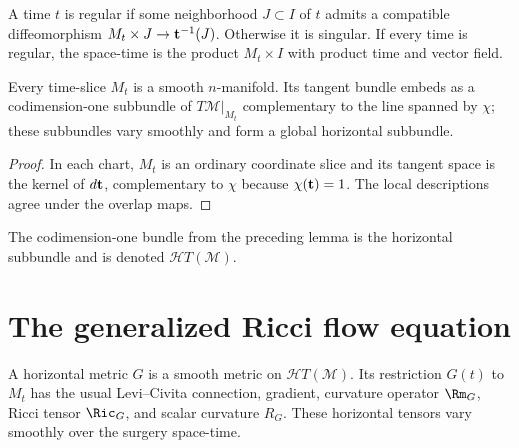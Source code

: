 \begin{definition}
\label{def:regular-singular-time-surgery}
A time $t$ is regular if some neighborhood $J\subset I$ of $t$ admits a
compatible diffeomorphism $M_t\times J\to{\bf t}^{-1}(J)$. Otherwise it is
singular. If every time is regular, the space-time is the product
$M_t\times I$ with product time and vector field.
\end{definition}

\begin{lemma}
\label{lem:time-slice-smooth-manifold}
Every time-slice $M_t$ is a smooth $n$-manifold. Its tangent bundle embeds as a
codimension-one subbundle of $T{\mathcal M}|_{M_t}$ complementary to the line
spanned by $\chi$; these subbundles vary smoothly and form a global horizontal
subbundle.
\end{lemma}

\begin{proof}
\sketch
In each chart, $M_t$ is an ordinary coordinate slice and its tangent space is
the kernel of $d{\bf t}$, complementary to $\chi$ because
$\chi({\bf t})=1$. The local descriptions agree under the overlap maps.
\end{proof}

\begin{definition}
\label{def:horizontal-subbundle}
The codimension-one bundle from the preceding lemma is the horizontal
subbundle and is denoted ${\mathcal HT}({\mathcal M})$.
\end{definition}

\section{The generalized Ricci flow equation}

\begin{definition}
\label{def:horizontal-metric}
A horizontal metric $G$ is a smooth metric on
${\mathcal HT}({\mathcal M})$. Its restriction $G(t)$ to $M_t$ has the usual
Levi--Civita connection, gradient, curvature operator $\Rm_G$, Ricci tensor
$\Ric_G$, and scalar curvature $R_G$. These horizontal tensors vary smoothly
over the surgery space-time.
\end{definition}

